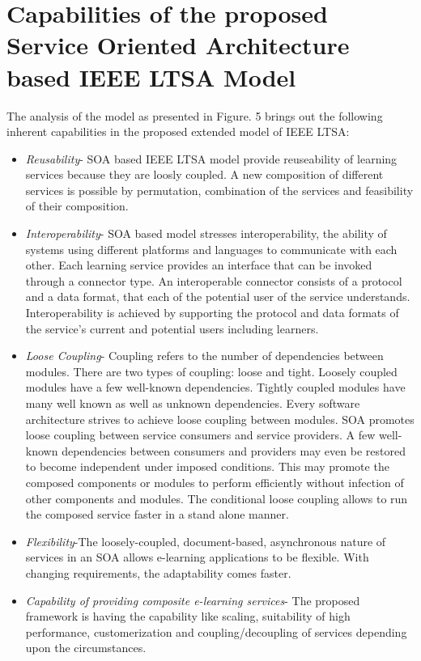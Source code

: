 \section{Capabilities of the proposed Service Oriented Architecture based IEEE LTSA Model}
The analysis of the model as presented in Figure. 5 brings out the following inherent
capabilities in the proposed extended model of IEEE LTSA:
\begin{itemize}
 \item \textit{Reusability}- SOA based IEEE LTSA model provide reuseability of learning services because they are loosly coupled. A new composition of different services
is possible by permutation, combination of the services and feasibility of their composition.
\item \textit{Interoperability}- SOA based model stresses interoperability, the ability of
systems using different platforms and languages to communicate with each other.
Each learning service provides an interface that can be invoked through a connector
type. An interoperable connector consists of a protocol and a data format, that
each of the potential user of the service understands. Interoperability is achieved
by supporting the protocol and data formats of the service’s current and potential
users including learners.
\item \textit{Loose Coupling}- Coupling refers to the number of dependencies between
modules. There are two types of coupling: loose and tight. Loosely coupled modules have a few well-known dependencies. Tightly coupled modules have many well
known as well as unknown dependencies. Every software architecture strives to
achieve loose coupling between modules. SOA promotes loose coupling between
service consumers and service providers. A few well-known dependencies between
consumers and providers may even be restored to become independent under imposed conditions. This may promote the composed components
 or modules to perform efficiently without infection of other components and modules. The conditional loose coupling allows to run 
the composed service faster in a stand alone
manner.
\item \textit{Flexibility}-The loosely-coupled, document-based, asynchronous nature of
services in an SOA allows e-learning applications to be flexible. With changing
requirements, the adaptability comes faster.
\item \textit{Capability of providing composite e-learning services}- The proposed framework is having the capability like scaling, 
suitability of high performance, customerization and coupling/decoupling of services depending upon the circumstances.

\end{itemize}

